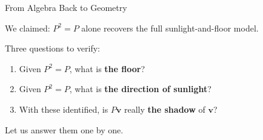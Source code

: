 \documentclass[10pt]{beamer}
\theoremstyle{definition}
\newcommand{\x}[1]{\alert{\textbf{#1}}}
\begin{document}
\begin{frame}{From Algebra Back to Geometry}

We claimed: $P^2 = P$ alone recovers the full sunlight-and-floor model.

\vspace{0.5em}

Three questions to verify:

\vspace{0.5em}

\begin{enumerate}
\item Given $P^2 = P$, what is \x{the floor}?

\vspace{0.3em}

\item Given $P^2 = P$, what is \x{the direction of sunlight}?

\vspace{0.3em}

\item With these identified, is $P\mathbf{v}$ really \x{the shadow} of $\mathbf{v}$?
\end{enumerate}

\vspace{1em}

Let us answer them one by one.

\end{frame}
\end{document}
